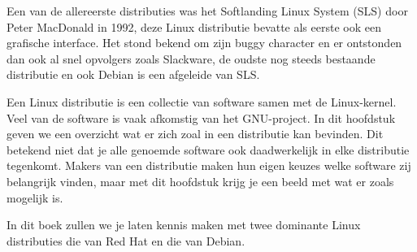 Een van de allereerste distributies was het Softlanding Linux System (SLS) door Peter MacDonald in 1992, deze Linux
distributie bevatte als eerste ook een grafische interface. Het stond bekend om zijn buggy character en er ontstonden
dan ook al snel opvolgers zoals Slackware, de oudste nog steeds bestaande distributie en ook Debian is een afgeleide
van SLS.\par

Een Linux distributie is een collectie van software samen met de Linux-kernel. Veel van de software is vaak afkomstig
van het GNU-project. In dit hoofdstuk geven we een overzicht wat er zich zoal in een distributie kan bevinden. Dit
betekend niet dat je alle genoemde software ook daadwerkelijk in elke distributie tegenkomt. Makers van een distributie
maken hun eigen keuzes welke software zij belangrijk vinden, maar met dit hoofdstuk krijg je een beeld met wat er zoals
mogelijk is.\par

In dit boek zullen we je laten kennis maken met twee dominante Linux distributies die van Red Hat en die van Debian.

